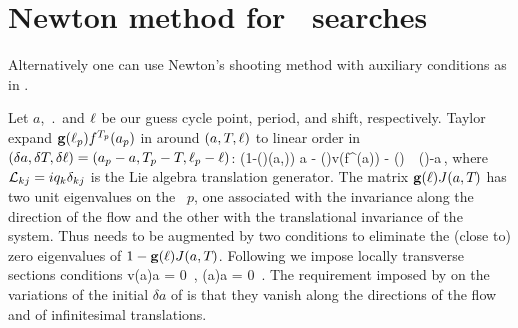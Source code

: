 

\section{Newton method  for \rpo\ searches}
\label{sec:NewtRPOs}

Alternatively one can use Newton's shooting method with auxiliary conditions 
as in .

Let $a$, $\period{}$ and $\ell$
be our guess cycle point, period, and shift, respectively.
Taylor expand $\mathbf{g}(\ell_p) {f^{{T_{p}}}(a_p)}$ in 
around $(a, {T_{}}, \ell)$ to linear order in
$(\delta a,\delta {T_{}},\delta \ell)
   =(a_p-a,{T_{p}} - {T_{}},\ell_p-\ell)$:
\beq
    \left({1}-(\shift)\jMps(a,\period{})\right) \delta a
   - (\shift)v(f^{\period{}}(a)) \delta \period{}
                            - \translGen{}(\shift) \delta \shift
                    \,\simeq\, (\shift)-a\,,
    \label{eq:NewtonBasicCond}
\eeq
where $\mathcal{L}_{kj}=i q_k \delta_{kj}$ is the Lie algebra translation
generator. The matrix $\mathbf{g}(\ell){J}(a,{T_{}})$
has two unit eigenvalues on the \rpo\ $p$,
one associated with the invariance along
the direction of the flow and the other with the
translational invariance of the system. Thus 
needs to be augmented by two conditions to
eliminate the (close to) zero eigenvalues of
$1-\mathbf{g}(\ell){J}(a,{T_{}})$. Following
 we impose locally transverse sections
conditions
\beq
    v(a)\cdot\delta a  =  0
    \,,\qquad
    \left(\translGen a\right)\cdot \delta a  =  0
\,.
\label{eq:NewtonAux}
\eeq
The requirement imposed by 
on the variations of the initial $\delta a$ of 
is that they   vanish along the directions of the flow
and of infinitesimal translations.

